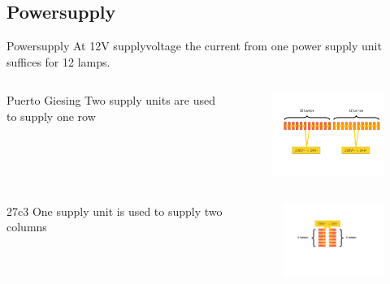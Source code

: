 \documentclass{beamer}
\begin{document}
\subsection{Powersupply}
  \begin{frame}{Powersupply}
  At 12V supplyvoltage the current from one power supply unit suffices for 12 lamps.
  \begin{columns}
    \begin{column}{4cm}
     \begin{block}{ Puerto Giesing}
     Two supply units are used to supply one row
     \end{block}
    \end{column}
    \begin{column}{7cm}
    \begin{figure}
    \includegraphics[width=6cm, clip, trim= 2.5cm 4.6cm 0.5cm 4cm]{bilder/12lampen.pdf}
    \end{figure}
    \end{column}
  \end{columns}
  \begin{columns}[T]
    \begin{column}{4cm}
    \vskip 0.4cm 
    \begin{block}{27c3}
     One supply unit is used to supply two columns 
    \end{block}
    \end{column}
    \begin{column}{7cm}
    \begin{figure}
    \includegraphics[width=4cm, clip, trim= 4cm 5cm 7cm 4cm]{bilder/6lampen.pdf}
    \end{figure}
    \end{column}
  \end{columns}
  \end{frame} 
\end{document}
